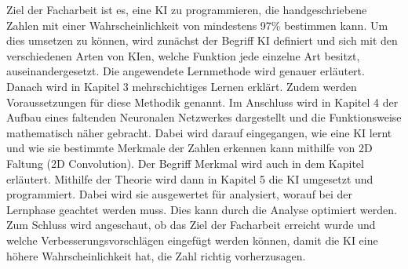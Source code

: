 \documentclass[11pt]{article}
\begin{document}
Ziel der Facharbeit ist es, eine KI zu programmieren, die handgeschriebene Zahlen mit einer Wahrscheinlichkeit von mindestens 97\% bestimmen kann.
Um dies umsetzen zu können, wird zunächst der Begriff KI definiert und sich mit den verschiedenen Arten von KIen,
welche Funktion jede einzelne Art besitzt, auseinandergesetzt. Die angewendete Lernmethode wird genauer erläutert.
Danach wird in Kapitel 3 mehrschichtiges Lernen erklärt. Zudem werden Voraussetzungen für diese Methodik genannt. Im Anschluss wird in Kapitel 4
der Aufbau eines faltenden Neuronalen Netzwerkes dargestellt und die Funktionsweise mathematisch näher gebracht. Dabei wird darauf eingegangen, wie eine KI
lernt und wie sie bestimmte Merkmale der Zahlen erkennen kann mithilfe von 2D Faltung (2D Convolution). Der Begriff Merkmal wird auch in dem Kapitel erläutert.
Mithilfe der Theorie wird dann in Kapitel 5 die KI umgesetzt und programmiert. Dabei wird sie ausgewertet für analysiert, worauf bei der Lernphase
geachtet werden muss. Dies kann durch die Analyse optimiert werden. Zum Schluss wird angeschaut, ob das Ziel der Facharbeit erreicht wurde und welche
Verbesserungsvorschlägen eingefügt werden können, damit die KI eine höhere Wahrscheinlichkeit hat, die Zahl richtig vorherzusagen.
\end{document}
